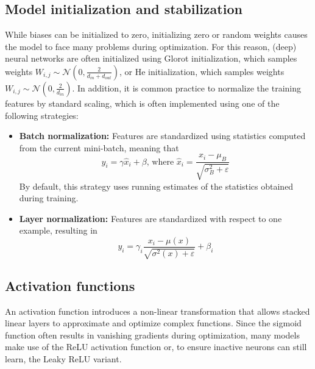 \documentclass{report}
\begin{document}
\subsection{Model initialization and stabilization}
While biases can be initialized to zero, initializing zero or random weights causes the model to face many problems during optimization. \newline
For this reason, (deep) neural networks are often initialized using Glorot initialization, which samples weights $W_{i, j} \sim \mathcal{N}(0, \frac{2}{d_{in} + d_{out}})$, or He initialization, which samples weights $W_{i, j} \sim \mathcal{N}(0, \frac{2}{d_{in}})$. \newline
In addition, it is common practice to normalize the training features by standard scaling, which is  often implemented using one of the following strategies:
\begin{itemize}
    \item \textbf{Batch normalization: }Features are standardized using statistics computed from the current mini-batch, meaning that
    \[y_i = \gamma\hat{x}_i + \beta \text{, where } \hat{x}_i = \frac{x_i - \mu_B}{\sqrt{\sigma_B^2 + \varepsilon}}\]
    By default, this strategy uses running estimates of the statistics obtained during training.
    \item \textbf{Layer normalization: }Features are standardized with respect to one example, resulting in
    \[y_i = \gamma_i\frac{x_i - \mu(x)}{\sqrt{\sigma^2(x) + \varepsilon}} + \beta_i\]
\end{itemize}
\subsection{Activation functions}
An activation function introduces a non-linear transformation that allows stacked linear layers to approximate and optimize complex functions. \newline
Since the sigmoid function often results in vanishing gradients during optimization, many models make use of the ReLU activation function or, to ensure inactive neurons can still learn, the Leaky ReLU variant.
\end{document}

